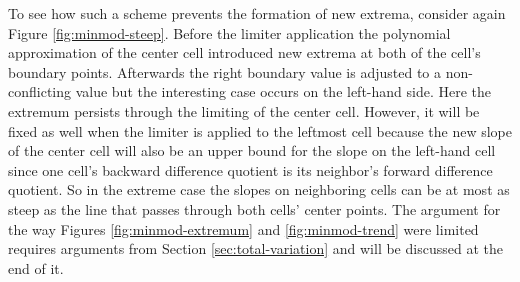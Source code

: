 To see how such a scheme prevents the formation of new extrema, consider again Figure \ref{fig:minmod-steep}.
Before the limiter application the polynomial approximation of the center cell introduced new extrema at both of the cell's boundary points.
Afterwards the right boundary value is adjusted to a non-conflicting value but the interesting case occurs on the left-hand side.
Here the extremum persists through the limiting of the center cell.
However, it will be fixed as well when the limiter is applied to the leftmost cell because the new slope of the center cell will also be an upper bound for the slope on the left-hand cell since one cell's backward difference quotient is its neighbor's forward difference quotient.
So in the extreme case the slopes on neighboring cells can be at most as steep as the line that passes through both cells' center points.
The argument for the way Figures \ref{fig:minmod-extremum} and \ref{fig:minmod-trend} were limited requires arguments from Section \ref{sec:total-variation} and will be discussed at the end of it.
